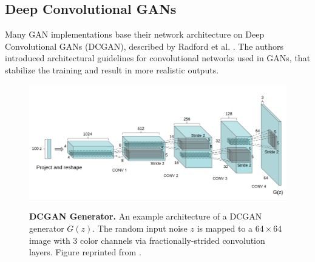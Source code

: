 \documentclass[12pt]{report}
\begin{document}
\subsection{Deep Convolutional GANs} \label{sec:dcgan}


Many GAN implementations base their network architecture on Deep Convolutional GANs (DCGAN), described by Radford et al. \cite{radford_unsupervised_2015}. The authors introduced architectural guidelines for convolutional networks used in GANs, that stabilize the training and result in more realistic outputs.

\begin{figure}[t]
\centering
{\includegraphics[width=\linewidth]{02_background/dcgan_generator}}
\caption{\label{fig:dcgan} \textbf{DCGAN Generator.} An example architecture of a DCGAN generator $G(z)$. The random input noise $z$ is mapped to a $64\times 64$ image with 3 color channels via fractionally-strided convolution layers. Figure reprinted from \cite{radford_unsupervised_2015}.}
\end{figure}
\end{document}
